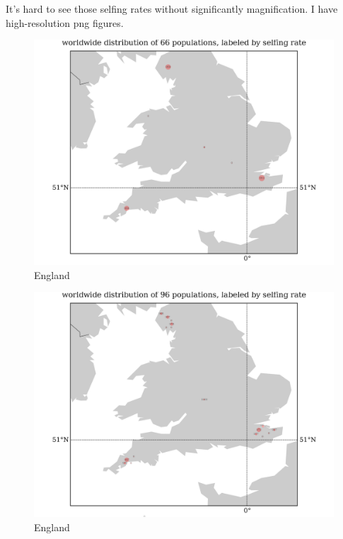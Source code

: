 \documentclass[a4paper,10pt]{article}
\begin{document}
It's hard to see those selfing rates without significantly magnification. I have high-resolution png figures.

\begin{figure}
\includegraphics[width=1\textwidth]{figures/s0829popid2ecotypeid_25_Eng__7_49_2_55_l3y1_pop_map.png}
\caption{England}\label{f12}
\end{figure}

\begin{figure}
\includegraphics[width=1\textwidth]{figures/s0829popid2ecotypeid_10_Eng__7_49_2_55_l3y1_pop_map.png}
\caption{England}\label{f11}
\end{figure}
\end{document}
